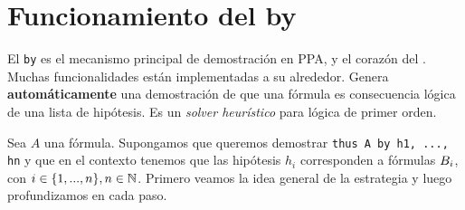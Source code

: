 \section{Funcionamiento del by}

El \lstinline{by} es el mecanismo principal de demostración en PPA, y el corazón
del \modCertifier. Muchas funcionalidades están implementadas a su alrededor.
Genera \textbf{automáticamente} una demostración de que una fórmula es
consecuencia lógica de una lista de hipótesis. Es un \textit{solver heurístico} para lógica de primer orden.

Sea $A$ una fórmula. Supongamos que queremos demostrar \lstinline{thus A by h1, ..., hn} y que en el contexto tenemos que las hipótesis $h_i$ corresponden a
fórmulas $B_i$, con $i \in \{1, ..., n\}, n \in \mathbb{N}$. Primero
veamos la idea general de la estrategia y luego profundizamos en cada paso.

